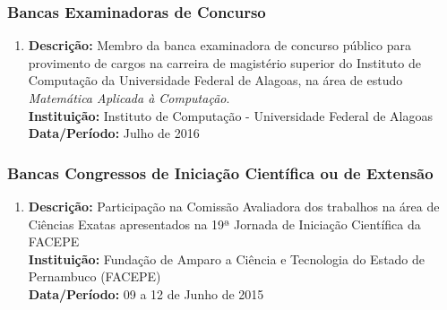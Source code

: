 \documentclass[a4paper,oneside,10pt]{article}
\begin{document}
\subsubsection{Bancas Examinadoras de Concurso}
\vspace{0.3cm}

\begin{enumerate}
\renewcommand{\labelenumi}{{\large\bfseries\arabic{enumi}.}}
\vspace{0.3cm}

\item       \textbf{Descrição:} Membro da banca examinadora de concurso público para provimento de cargos na carreira de magistério superior do Instituto de Computação da Universidade Federal de Alagoas, na área de estudo \emph{Matemática Aplicada à Computação}. \mbox{}\\
            \textbf{Instituição:} Instituto de Computação - Universidade Federal de Alagoas\\
            \textbf{Data/Período:} Julho de 2016 %

\end{enumerate}


\subsubsection{Bancas Congressos de Inicia\c{c}\~{a}o Cient\'{i}fica ou de Extens\~{a}o}
\vspace{0.3cm}

\begin{enumerate}
\renewcommand{\labelenumi}{{\large\bfseries\arabic{enumi}.}}
\vspace{0.3cm}

\item       \textbf{Descrição:} Participação na Comissão Avaliadora dos trabalhos na área de Ciências Exatas apresentados na 19ª Jornada de Iniciação Científica da FACEPE \mbox{} \\
            \textbf{Instituição:} Fundação de Amparo a Ciência e Tecnologia do Estado de Pernambuco (FACEPE) \\
            \textbf{Data/Período:} 09 a 12 de Junho de 2015

\end{enumerate}
\end{document}
